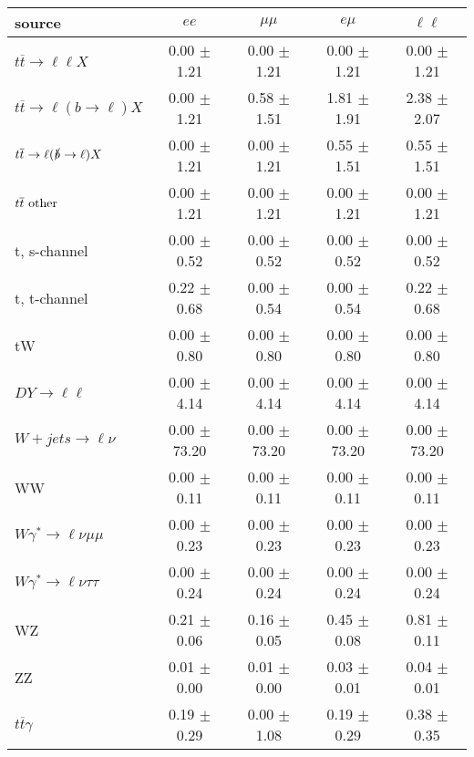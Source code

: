\begin{tabular}{l|cccc} \hline\hline
source & $ee$ & $\mu\mu$ & $e\mu$ & $\ell\ell $ \\
\hline
$t\overline{t} \rightarrow \ell \ell X$ &  0.00 $\pm$  1.21 &  0.00 $\pm$  1.21 &  0.00 $\pm$  1.21 &  0.00 $\pm$  1.21 \\
$t\overline{t} \rightarrow \ell (b \rightarrow \ell) X$ &  0.00 $\pm$  1.21 &  0.58 $\pm$  1.51 &  1.81 $\pm$  1.91 &  2.38 $\pm$  2.07 \\
$t\overline{t} \rightarrow \ell (\slashed b \rightarrow \ell) X$ &  0.00 $\pm$  1.21 &  0.00 $\pm$  1.21 &  0.55 $\pm$  1.51 &  0.55 $\pm$  1.51 \\
        $t\overline{t}\ \rm{other}$ &  0.00 $\pm$  1.21 &  0.00 $\pm$  1.21 &  0.00 $\pm$  1.21 &  0.00 $\pm$  1.21 \\
\hline
                       t, s-channel &  0.00 $\pm$  0.52 &  0.00 $\pm$  0.52 &  0.00 $\pm$  0.52 &  0.00 $\pm$  0.52 \\
                       t, t-channel &  0.22 $\pm$  0.68 &  0.00 $\pm$  0.54 &  0.00 $\pm$  0.54 &  0.22 $\pm$  0.68 \\
                                 tW &  0.00 $\pm$  0.80 &  0.00 $\pm$  0.80 &  0.00 $\pm$  0.80 &  0.00 $\pm$  0.80 \\
\hline
         $DY \rightarrow \ell \ell$ &  0.00 $\pm$  4.14 &  0.00 $\pm$  4.14 &  0.00 $\pm$  4.14 &  0.00 $\pm$  4.14 \\
      $W+jets \rightarrow \ell \nu$ &  0.00 $\pm$ 73.20 &  0.00 $\pm$ 73.20 &  0.00 $\pm$ 73.20 &  0.00 $\pm$ 73.20 \\
                                 WW &  0.00 $\pm$  0.11 &  0.00 $\pm$  0.11 &  0.00 $\pm$  0.11 &  0.00 $\pm$  0.11 \\
\hline
$W\gamma^{*} \rightarrow \ell \nu \mu\mu$ &  0.00 $\pm$  0.23 &  0.00 $\pm$  0.23 &  0.00 $\pm$  0.23 &  0.00 $\pm$  0.23 \\
$W\gamma^{*} \rightarrow \ell \nu \tau\tau$ &  0.00 $\pm$  0.24 &  0.00 $\pm$  0.24 &  0.00 $\pm$  0.24 &  0.00 $\pm$  0.24 \\
                                 WZ &  0.21 $\pm$  0.06 &  0.16 $\pm$  0.05 &  0.45 $\pm$  0.08 &  0.81 $\pm$  0.11 \\
                                 ZZ &  0.01 $\pm$  0.00 &  0.01 $\pm$  0.00 &  0.03 $\pm$  0.01 &  0.04 $\pm$  0.01 \\
\hline
              $t\overline{t}\gamma$ &  0.19 $\pm$  0.29 &  0.00 $\pm$  1.08 &  0.19 $\pm$  0.29 &  0.38 $\pm$  0.35 \\

\end{tabular}
